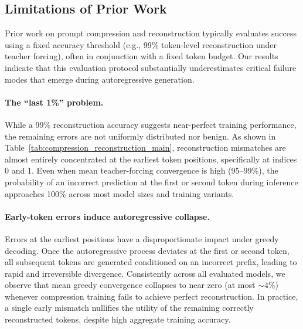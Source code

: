\documentclass{article}
\theoremstyle{plain}
\theoremstyle{definition}
\theoremstyle{remark}
\begin{document}
\subsection{Limitations of Prior Work}
\label{sec:prior_limitations}

Prior work on prompt compression and reconstruction typically evaluates success
using a fixed accuracy threshold (e.g., 99\% token-level reconstruction under
teacher forcing), often in conjunction with a fixed token budget.
Our results indicate that this evaluation protocol substantially underestimates
critical failure modes that emerge during autoregressive generation.

\begin{table}[t]
    \centering
    \caption{Reconstruction brittleness on PG19. Despite high teacher-forcing
    convergence (TF conv.), greedy decoding from the compression embedding
    collapses (Greedy ${\approx}\,0$) because the residual ${\sim}1\%$ error is
    concentrated at the first two token positions (mismatch rate at indices
    0/1). Full per-variant breakdown in
    Table~\ref{tab:compression_reconstruction_summary}.}
    \label{tab:compression_reconstruction_main}

    \begin{small}
    
    \end{small}

\end{table}

\paragraph{The ``last 1\%'' problem.}
While a 99\% reconstruction accuracy suggests near-perfect training performance,
the remaining errors are not uniformly distributed nor benign.
As shown in Table~\ref{tab:compression_reconstruction_main}, reconstruction
mismatches are almost entirely concentrated at the earliest token positions,
specifically at indices 0 and 1.
Even when mean teacher-forcing convergence is high (95--99\%), the probability of an
incorrect prediction at the first or second token during inference approaches
100\% across most model sizes and training variants.

\paragraph{Early-token errors induce autoregressive collapse.}
Errors at the earliest positions have a disproportionate impact under greedy
decoding.
Once the autoregressive process deviates at the first or second token, all
subsequent tokens are generated conditioned on an incorrect prefix, leading to
rapid and irreversible divergence.
Consistently across all evaluated models, we observe that mean greedy convergence
collapses to near zero (at most ${\sim}4\%$) whenever compression training fails to
achieve perfect reconstruction.
In practice, a single early mismatch nullifies the utility of the remaining
correctly reconstructed tokens, despite high aggregate training accuracy.
\end{document}
